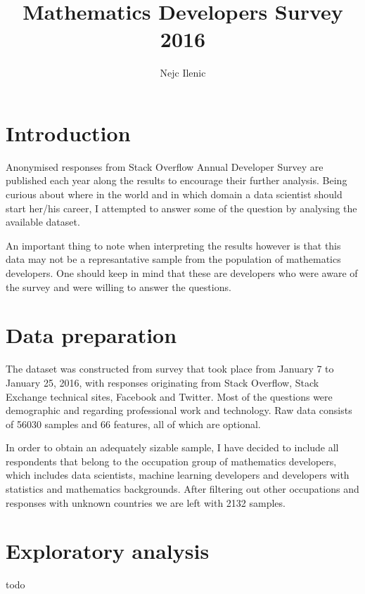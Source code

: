 \documentclass{article}
\begin{document}





\title{Mathematics Developers Survey 2016}
\author{Nejc Ilenic}
\date{}
\maketitle

\section{Introduction}
Anonymised responses from Stack Overflow Annual Developer Survey are published each year along the results to encourage their further analysis. Being curious about where in the world and in which domain a data scientist should start her/his career, I attempted to answer some of the question by analysing the available dataset.

\vspace{2mm}

An important thing to note when interpreting the results however is that this data may not be a represantative sample from the population of mathematics developers. One should keep in mind that these are developers who were aware of the survey and were willing to answer the questions.

\section{Data preparation}
The dataset was constructed from survey that took place from January 7 to January 25, 2016, with responses originating from Stack Overflow, Stack Exchange technical sites, Facebook and Twitter. Most of the questions were demographic and regarding professional work and technology. Raw data consists of 56030 samples and 66 features, all of which are optional.

In order to obtain an adequately sizable sample, I have decided to include all respondents that belong to the occupation group of mathematics developers, which includes data scientists, machine learning developers and developers with statistics and mathematics backgrounds. After filtering out other occupations and responses with unknown countries we are left with 2132 samples.

\section{Exploratory analysis}
todo
\end{document}
